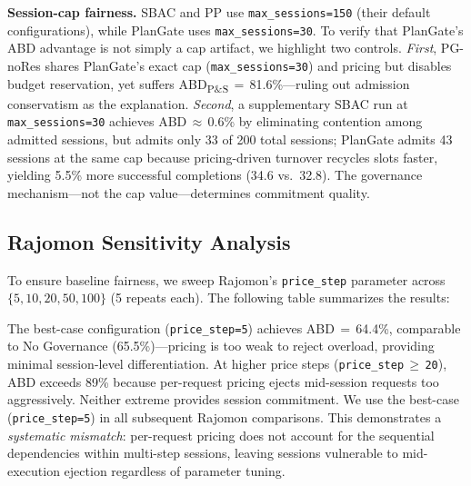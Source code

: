 \documentclass[sigconf,review,anonymous]{acmart}
\begin{document}
\textbf{Session-cap fairness.}
SBAC and PP use \texttt{max\_sessions=150} (their default configurations), while PlanGate uses \texttt{max\_sessions=30}. To verify that PlanGate's ABD advantage is not simply a cap artifact, we highlight two controls.
\emph{First}, PG-noRes shares PlanGate's exact cap (\texttt{max\_sessions=30}) and pricing but disables budget reservation, yet suffers ABD\textsubscript{P\&S}$\,{=}\,$81.6\%---ruling out admission conservatism as the explanation.
\emph{Second}, a supplementary SBAC run at \texttt{max\_sessions=30} achieves ABD$\,{\approx}\,$0.6\% by eliminating contention among admitted sessions, but admits only 33 of 200 total sessions; PlanGate admits 43 sessions at the same cap because pricing-driven turnover recycles slots faster, yielding 5.5\% more successful completions (34.6 vs.\ 32.8). The governance mechanism---not the cap value---determines commitment quality.


\subsection{Rajomon Sensitivity Analysis}
\label{sec:rajomon_sens}

To ensure baseline fairness, we sweep Rajomon's \texttt{price\_step} parameter across $\{5, 10, 20, 50, 100\}$ (5 repeats each). The following table summarizes the results:

\begin{table}[h]
\centering
\small
{}
\end{table}

The best-case configuration (\texttt{price\_step=5}) achieves ABD$\,{=}\,$64.4\%, comparable to No Governance (65.5\%)---pricing is too weak to reject overload, providing minimal session-level differentiation. At higher price steps (\texttt{price\_step$\,{\geq}\,$20}), ABD exceeds 89\% because per-request pricing ejects mid-session requests too aggressively. Neither extreme provides session commitment. We use the best-case (\texttt{price\_step=5}) in all subsequent Rajomon comparisons. This demonstrates a \emph{systematic mismatch}: per-request pricing does not account for the sequential dependencies within multi-step sessions, leaving sessions vulnerable to mid-execution ejection regardless of parameter tuning.
\end{document}
